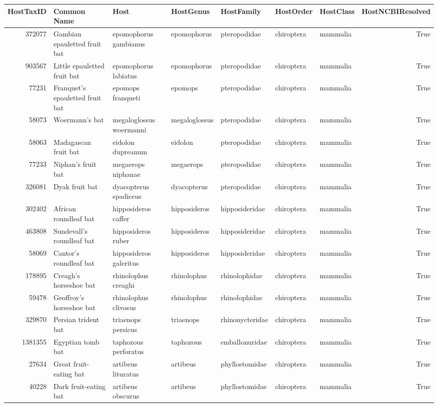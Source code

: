 \begin{tabular}{rllllllr}
\toprule
HostTaxID & Common Name & Host & HostGenus & HostFamily & HostOrder & HostClass & HostNCBIResolved \\
\midrule
372077 & Gambian epauletted fruit bat & epomophorus gambianus & epomophorus & pteropodidae & chiroptera & mammalia & True \\
903567 & Little epauletted fruit bat & epomophorus labiatus & epomophorus & pteropodidae & chiroptera & mammalia & True \\
77231 & Franquet's epauletted fruit bat & epomops franqueti & epomops & pteropodidae & chiroptera & mammalia & True \\
58073 & Woermann's bat & megaloglossus woermanni & megaloglossus & pteropodidae & chiroptera & mammalia & True \\
58063 & Madagascan fruit bat & eidolon dupreanum & eidolon & pteropodidae & chiroptera & mammalia & True \\
77233 & Niphan's fruit bat & megaerops niphanae & megaerops & pteropodidae & chiroptera & mammalia & True \\
326081 & Dyak fruit bat & dyacopterus spadiceus & dyacopterus & pteropodidae & chiroptera & mammalia & True \\
302402 & African roundleaf bat & hipposideros caffer & hipposideros & hipposideridae & chiroptera & mammalia & True \\
463808 & Sundevall's roundleaf bat & hipposideros ruber & hipposideros & hipposideridae & chiroptera & mammalia & True \\
58069 & Cantor's roundleaf bat & hipposideros galeritus & hipposideros & hipposideridae & chiroptera & mammalia & True \\
178895 & Creagh's horseshoe bat & rhinolophus creaghi & rhinolophus & rhinolophidae & chiroptera & mammalia & True \\
59478 & Geoffroy's horseshoe bat & rhinolophus clivosus & rhinolophus & rhinolophidae & chiroptera & mammalia & True \\
329870 & Persian trident bat & triaenops persicus & triaenops & rhinonycteridae & chiroptera & mammalia & True \\
1381355 & Egyptian tomb bat & taphozous perforatus & taphozous & emballonuridae & chiroptera & mammalia & True \\
27634 & Great fruit-eating bat & artibeus lituratus & artibeus & phyllostomidae & chiroptera & mammalia & True \\
40228 & Dark fruit-eating bat & artibeus obscurus & artibeus & phyllostomidae & chiroptera & mammalia & True \\

\end{tabular}
